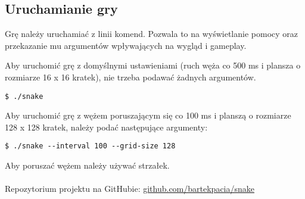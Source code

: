 \documentclass[12pt]{article}
\begin{document}
\subsection{Uruchamianie gry}

Grę należy uruchamiać z linii komend. Pozwala to na wyświetlanie pomocy oraz
przekazanie mu argumentów wpływających na wygląd i gameplay.

Aby uruchomić grę z domyślnymi ustawieniami (ruch węża co 500 ms i plansza o
rozmiarze 16 x 16 kratek), nie trzeba podawać żadnych argumentów.


\begin{lstlisting}
$ ./snake
\end{lstlisting}

Aby uruchomić grę z wężem poruszającym się co 100 ms i planszą o rozmiarze 128 x
128 kratek, należy podać następujące argumenty:

\begin{lstlisting}
$ ./snake --interval 100 --grid-size 128
\end{lstlisting}

Aby poruszać wężem należy używać strzałek. \\~\\
Repozytorium projektu na GitHubie:
\href{https://github.com/bartekpacia/snake}{github.com/bartekpacia/snake}
\end{document}
